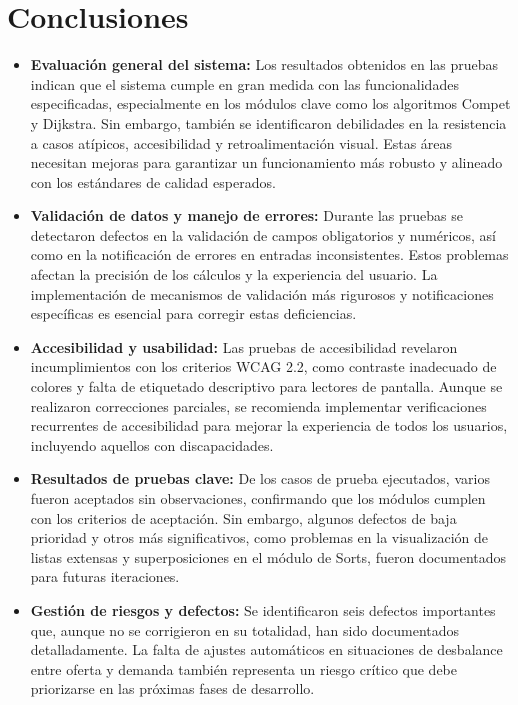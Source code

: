 \documentclass[stu, 12pt, letterpaper, donotrepeattitle, floatsintext, natbib]{apa7}
\begin{document}
\section{Conclusiones}

\begin{itemize}
    \item \textbf{Evaluaci\'on general del sistema:} Los resultados obtenidos en las pruebas indican que el sistema cumple en gran medida con las funcionalidades especificadas, especialmente en los m\'odulos clave como los algoritmos Compet y Dijkstra. Sin embargo, tambi\'en se identificaron debilidades en la resistencia a casos at\'ipicos, accesibilidad y retroalimentaci\'on visual. Estas \'areas necesitan mejoras para garantizar un funcionamiento m\'as robusto y alineado con los est\'andares de calidad esperados.

    \item \textbf{Validaci\'on de datos y manejo de errores:} Durante las pruebas se detectaron defectos en la validaci\'on de campos obligatorios y num\'ericos, as\'i como en la notificaci\'on de errores en entradas inconsistentes. Estos problemas afectan la precisi\'on de los c\'alculos y la experiencia del usuario. La implementaci\'on de mecanismos de validaci\'on m\'as rigurosos y notificaciones espec\'ificas es esencial para corregir estas deficiencias.

    \item \textbf{Accesibilidad y usabilidad:} Las pruebas de accesibilidad revelaron incumplimientos con los criterios WCAG 2.2, como contraste inadecuado de colores y falta de etiquetado descriptivo para lectores de pantalla. Aunque se realizaron correcciones parciales, se recomienda implementar verificaciones recurrentes de accesibilidad para mejorar la experiencia de todos los usuarios, incluyendo aquellos con discapacidades.

    \item \textbf{Resultados de pruebas clave:} De los casos de prueba ejecutados, varios fueron aceptados sin observaciones, confirmando que los m\'odulos cumplen con los criterios de aceptaci\'on. Sin embargo, algunos defectos de baja prioridad y otros m\'as significativos, como problemas en la visualizaci\'on de listas extensas y superposiciones en el m\'odulo de Sorts, fueron documentados para futuras iteraciones.

    \item \textbf{Gestión de riesgos y defectos:} Se identificaron seis defectos importantes que, aunque no se corrigieron en su totalidad, han sido documentados detalladamente. La falta de ajustes autom\'aticos en situaciones de desbalance entre oferta y demanda tambi\'en representa un riesgo cr\'itico que debe priorizarse en las pr\'oximas fases de desarrollo.


\end{itemize}
\end{document}
